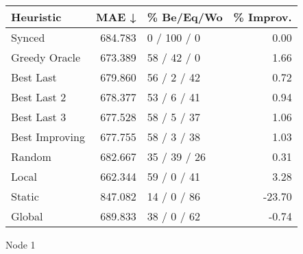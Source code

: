 \begin{tabular}{lrlr}
\toprule
\textbf{Heuristic} & \textbf{MAE ↓} & \textbf{\% Be/Eq/Wo} & \textbf{\% Improv.} \\
\midrule
            Synced &        684.783 &          0 / 100 / 0 &                0.00 \\
     Greedy Oracle &        673.389 &          58 / 42 / 0 &                1.66 \\
         Best Last &        679.860 &          56 / 2 / 42 &                0.72 \\
       Best Last 2 &        678.377 &          53 / 6 / 41 &                0.94 \\
       Best Last 3 &        677.528 &          58 / 5 / 37 &                1.06 \\
    Best Improving &        677.755 &          58 / 3 / 38 &                1.03 \\
            Random &        682.667 &         35 / 39 / 26 &                0.31 \\
             Local &        662.344 &          59 / 0 / 41 &                3.28 \\
            Static &        847.082 &          14 / 0 / 86 &              -23.70 \\
            Global &        689.833 &          38 / 0 / 62 &               -0.74 \\
\bottomrule
\end{tabular}
\caption{Node 1}
\label{tab:non_lr05_le2_bs4_1}
